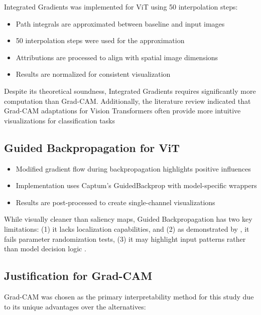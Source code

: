 \documentclass[a4paper,12pt]{report}
\begin{document}
Integrated Gradients was implemented for ViT using 50 interpolation steps:

\begin{itemize}
    \item Path integrals are approximated between baseline and input images
    \item 50 interpolation steps were used for the approximation
    \item Attributions are processed to align with spatial image dimensions
    \item Results are normalized for consistent visualization
\end{itemize}

Despite its theoretical soundness, Integrated Gradients requires significantly more computation than Grad-CAM. Additionally, the literature review indicated that Grad-CAM adaptations for Vision Transformers often provide more intuitive visualizations for classification tasks \cite{chefer2021transformer}

\subsection{Guided Backpropagation for ViT}


\begin{itemize}
    \item Modified gradient flow during backpropagation highlights positive influences
    \item Implementation uses Captum's GuidedBackprop with model-specific wrappers
    \item Results are post-processed to create single-channel visualizations
\end{itemize}

While visually cleaner than saliency maps, Guided Backpropagation has two key limitations: (1) it lacks localization capabilities, and (2) as demonstrated by \citep{Adebayo2018}, it fails parameter randomization tests, (3) it may highlight input patterns rather than model decision logic \cite{nie2018theoretical}.

\subsection{Justification for Grad-CAM}

Grad-CAM was chosen as the primary interpretability method for this study due to its unique advantages over the alternatives:
\end{document}
